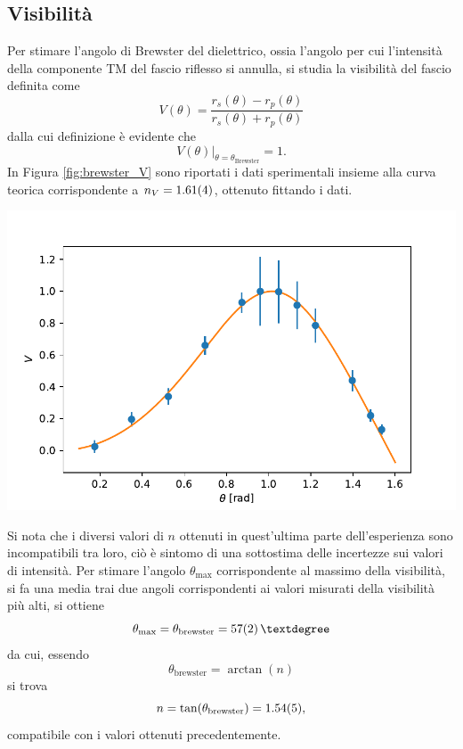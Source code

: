 \documentclass[10pt,oneside,a4paper]{article}
\newenvironment{Figure}
  {\par\medskip\noindent\minipage{\linewidth}}
  {\endminipage\par\medskip}
\begin{document}
\begin{multicols}{2}
\subsection{Visibilità}
Per stimare l'angolo di Brewster del dielettrico, ossia l'angolo per cui l'intensità della componente TM del fascio riflesso si annulla, si studia la visibilità del fascio definita come
\begin{equation}\label{eq:visibilità}
	V(\theta) = \frac{r_s(\theta) - r_p(\theta)}{r_s(\theta) + r_p(\theta)}
\end{equation}
dalla cui definizione è evidente che
\begin{equation}
	\left. V(\theta) \right\vert_{\theta = \theta_\mathrm{Brewster}} = 1.
\end{equation}
In Figura \ref{fig:brewster_V} sono riportati i dati sperimentali insieme alla curva teorica corrispondente a $n_V = \SI{1.61 \pm 0.04}{}$, ottenuto fittando i dati.
\begin{Figure}
	\begin{center}
	\includegraphics[width=\linewidth]{visibilità.pdf}
	\label{fig:brewster_V}
	\end{center}
\end{Figure}
Si nota che i diversi valori di $n$ ottenuti in quest'ultima parte dell'esperienza sono incompatibili tra loro, ciò è sintomo di una sottostima delle incertezze sui valori di intensità.
Per stimare l'angolo $\theta_\mathrm{max}$ corrispondente al massimo della visibilità, si fa una media trai due angoli corrispondenti ai valori misurati della visibilità più alti, si ottiene
\begin{equation}
	\theta_\mathrm{max} = \theta_\mathrm{brewster} = \SI{57 \pm 2}{°}
\end{equation}
da cui, essendo 
\begin{equation}
	\theta_\mathrm{brewster} = \arctan (n)
\end{equation}
si trova 
\begin{equation}
	n = \tan (\theta_\mathrm{brewster} )= \SI{1.54 \pm 0.05}{},
\end{equation}
compatibile con i valori ottenuti precedentemente.

\end{multicols}
\end{document}
